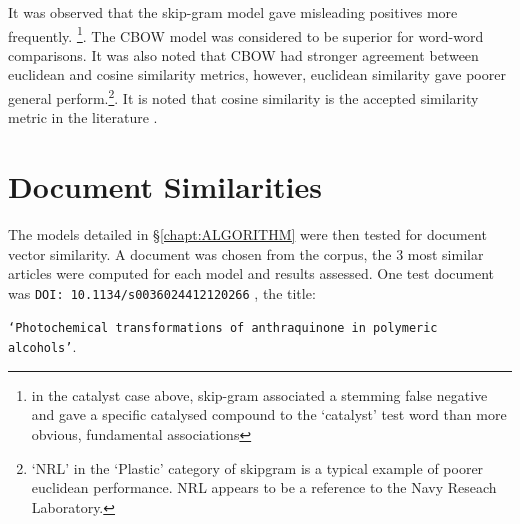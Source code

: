 It was observed that the skip-gram model gave misleading positives more frequently. \footnote{in the catalyst case above, skip-gram associated a stemming false negative and gave a specific catalysed compound to the `catalyst' test word than more obvious, fundamental associations}. The CBOW model was considered to be superior for word-word comparisons. It was also noted that CBOW had stronger agreement between euclidean and cosine similarity metrics, however, euclidean similarity gave poorer general perform.\footnote{`NRL' in the `Plastic' category of skipgram is a typical example of poorer euclidean performance. NRL appears to be a reference to the Navy Reseach Laboratory. }. It is noted that cosine similarity is the accepted similarity metric in the literature \cite{word2vec1} \cite{word2vec2} \cite{doc2vec}.

\section{Document Similarities}
The models detailed in \S\ref{chapt:ALGORITHM} were then tested for document vector similarity. A document was chosen from the corpus, the 3 most similar articles were computed for each model and results assessed. One test document was \texttt{DOI: 10.1134/s0036024412120266} \cite{docassay}, the title:


\texttt{`Photochemical transformations of anthraquinone in polymeric alcohols'}.

